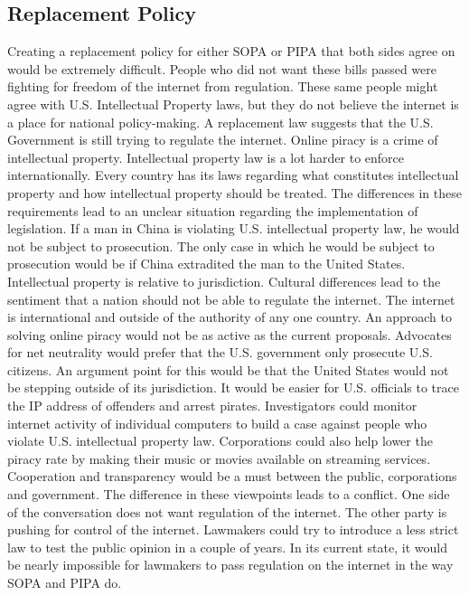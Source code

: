 \documentclass[11pt,journal,compsoc]{IEEEtran}
\begin{document}
\subsection{Replacement Policy}
Creating a replacement policy for either SOPA or PIPA that both sides agree on would be extremely difficult. People who did not want these bills passed were fighting for freedom of the internet from regulation. These same people might agree with U.S. Intellectual Property laws, but they do not believe the internet is a place for national policy-making. A replacement law suggests that the U.S. Government is still trying to regulate the internet. 
\indent Online piracy is a crime of intellectual property. Intellectual property law is a lot harder to enforce internationally. Every country has its laws regarding what constitutes intellectual property and how intellectual property should be treated. The differences in these requirements lead to an unclear situation regarding the implementation of legislation. If a man in China is violating U.S. intellectual property law, he would not be subject to prosecution. The only case in which he would be subject to prosecution would be if China extradited the man to the United States. Intellectual property is relative to jurisdiction. Cultural differences lead to the sentiment that a nation should not be able to regulate the internet. The internet is international and outside of the authority of any one country. 
\indent An approach to solving online piracy would not be as active as the current proposals. Advocates for net neutrality would prefer that the U.S. government only prosecute U.S. citizens. An argument point for this would be that the United States would not be stepping outside of its jurisdiction. It would be easier for U.S. officials to trace the IP address of offenders and arrest pirates. Investigators could monitor internet activity of individual computers to build a case against people who violate U.S. intellectual property law. Corporations could also help lower the piracy rate by making their music or movies available on streaming services. Cooperation and transparency would be a must between the public, corporations and government.
\indent The difference in these viewpoints leads to a conflict. One side of the conversation does not want regulation of the internet. The other party is pushing for control of the internet. Lawmakers could try to introduce a less strict law to test the public opinion in a couple of years. In its current state, it would be nearly impossible for lawmakers to pass regulation on the internet in the way SOPA and PIPA do. 
\end{document}

